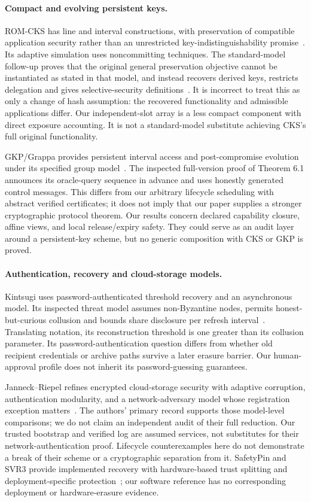 \documentclass[pdflatex,sn-mathphys-num]{sn-jnl}
\theoremstyle{plain}
\theoremstyle{definition}
\begin{document}
\paragraph{Compact and evolving persistent keys.}
ROM-CKS has line and interval constructions, with preservation of compatible application security rather than an unrestricted key-indistinguishability promise~\cite{dodis2024}. Its adaptive simulation uses noncommitting techniques. The standard-model follow-up proves that the original general preservation objective cannot be instantiated as stated in that model, and instead recovers derived keys, restricts delegation and gives selective-security definitions~\cite{dodisstandard2024}. It is incorrect to treat this as only a change of hash assumption: the recovered functionality and admissible applications differ. Our independent-slot array is a less compact component with direct exposure accounting. It is not a standard-model substitute achieving CKS's full original functionality.

GKP/Grappa provides persistent interval access and post-compromise evolution under its specified group model~\cite{backendal2026}. The inspected full-version proof of Theorem 6.1 announces its oracle-query sequence in advance and uses honestly generated control messages. This differs from our arbitrary lifecycle scheduling with abstract verified certificates; it does not imply that our paper supplies a stronger cryptographic protocol theorem. Our results concern declared capability closure, affine views, and local release/expiry safety. They could serve as an audit layer around a persistent-key scheme, but no generic composition with CKS or GKP is proved.

\paragraph{Authentication, recovery and cloud-storage models.}
Kintsugi uses password-authenticated threshold recovery and an asynchronous model. Its inspected threat model assumes non-Byzantine nodes, permits honest-but-curious collusion and bounds share disclosure per refresh interval~\cite{ma2025}. Translating notation, its reconstruction threshold is one greater than its collusion parameter. Its password-authentication question differs from whether old recipient credentials or archive paths survive a later erasure barrier. Our human-approval profile does not inherit its password-guessing guarantees.

Janneck--Riepel refines encrypted cloud-storage security with adaptive corruption, authentication modularity, and a network-adversary model whose registration exception matters~\cite{janneck2026}. The authors' primary record supports those model-level comparisons; we do not claim an independent audit of their full reduction. Our trusted bootstrap and verified log are assumed services, not substitutes for their network-authentication proof. Lifecycle counterexamples here do not demonstrate a break of their scheme or a cryptographic separation from it. SafetyPin and SVR3 provide implemented recovery with hardware-based trust splitting and deployment-specific protection~\cite{dauterman2020,connell2024}; our software reference has no corresponding deployment or hardware-erasure evidence.
\end{document}
